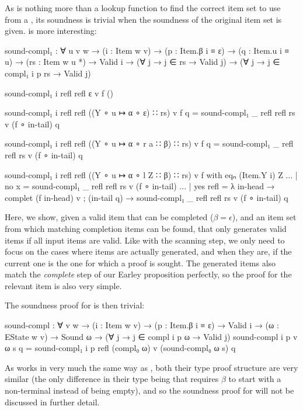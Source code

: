 		As  is nothing more than a lookup function to find
		the correct item set to use from a , its soundness is
		trivial when the soundness of the original item set is given.
		 is more interesting:

		\begin{code}
			  sound-compl₁ : ∀ {u v w} →
			    (i : Item w v) →
			    (p : Item.β i ≡ ε) →
			    (q : Item.u i ≡ u) →
			    (rs : Item w u *) →
			    Valid i → (∀ {j} → j ∈ rs → Valid j) →
			    (∀ {j} → j ∈ compl₁ i p rs → Valid j)
			
			  sound-compl₁ i refl refl ε v f ()
			
			  sound-compl₁ i refl refl ((Y ∘ u ↦ α ∘ ε) ∷ rs) v f q =
			    sound-compl₁ _ refl refl rs v (f ∘ in-tail) q
			
			  sound-compl₁ i refl refl ((Y ∘ u ↦ α ∘ r a ∷ β) ∷ rs) v f q =
			    sound-compl₁ _ refl refl rs v (f ∘ in-tail) q
			
			  sound-compl₁ i refl refl ((Y ∘ u ↦ α ∘ l Z ∷ β) ∷ rs) v f with eqₙ (Item.Y i) Z
			  ... | no x = sound-compl₁ _ refl refl rs v (f ∘ in-tail)
			  ... | yes refl =
			    λ { in-head → complet (f in-head) v
			      ; (in-tail q) → sound-compl₁ _ refl refl rs v (f ∘ in-tail) q
			      }
		\end{code}

		Here, we show, given a valid item that can be completed ($\beta =
		\epsilon$), and an item set from which matching completion items can be
		found, that  only generates valid items if all input
		items are valid. Like with the scanning step, we only need to focus on
		the cases where items are actually generated, and when they are, if the
		current one is the one for which a proof is sought. The generated items
		also match the \emph{complete} step of our Earley proposition
		perfectly, so the proof for the relevant item is also very simple.

		The soundness proof for  is then trivial:

		\begin{code}
			  sound-compl : ∀ {v w} →
			    (i : Item w v) →
			    (p : Item.β i ≡ ε) →
			    Valid i → (ω : EState w v) → Sound ω →
			    (∀ {j} → j ∈ compl i p ω → Valid j)
			  sound-compl i p v ω s q =
			    sound-compl₁ i p refl (compl₀ ω) v (sound-compl₀ ω s) q
		\end{code}

		As  works in very much the same way as
		, both their type proof structure are very similar (the
		only difference in their type being that  requires
		$\beta$ to start with a non-terminal instead of being empty), and so
		the soundness proof for  will not be discussed in
		further detail.

